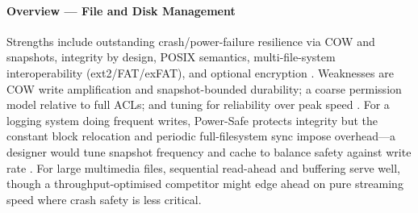 \paragraph{Overview --- File and Disk Management}

Strengths include outstanding crash/power-failure resilience via COW
and snapshots, integrity by design, POSIX semantics, multi-file-system
interoperability (ext2/FAT/exFAT), and optional encryption
\citep{qnx_powersafe_fs, qnx_neutrino_overview, qnx_fs_fault_tolerance}.
Weaknesses are COW write amplification and snapshot-bounded durability;
a coarse permission model relative to full ACLs; and tuning for
reliability over peak speed
\citep{qnx_fs_fault_tolerance, qnx_powersafe_perf}. For a logging
system doing frequent writes, Power-Safe protects integrity but the
constant block relocation and periodic full-filesystem sync impose
overhead---a designer would tune snapshot frequency and cache to
balance safety against write rate \citep{qnx_powersafe_perf}. For large
multimedia files, sequential read-ahead and buffering serve well,
though a throughput-optimised competitor might edge ahead on pure
streaming speed where crash safety is less critical.
